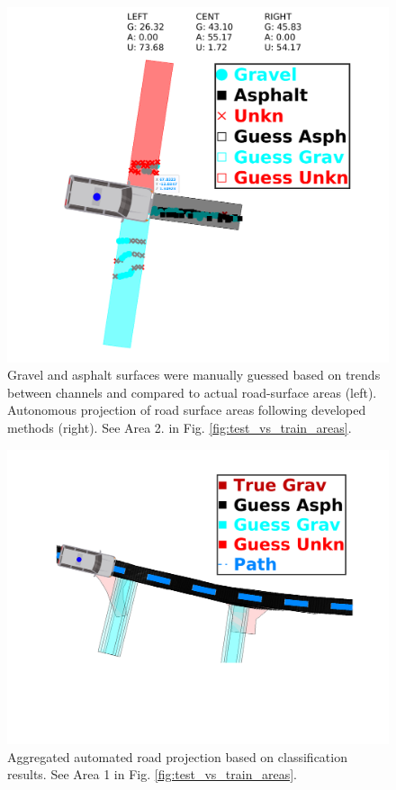 \documentclass[journal,onecolumn]{IEEEtran}
\begin{document}
			\begin{figure}[H]
				\centering
				\includegraphics[width=0.75\linewidth]{figures/auto_area_guess_4}
				\caption[Projected Guess vs Truth]{Gravel and asphalt surfaces were manually guessed based on trends between channels and compared to actual road-surface areas (left). Autonomous projection of road surface areas following developed methods (right). See Area 2. in Fig. \ref{fig:test_vs_train_areas}.}
				\label{fig:auto_area_guess}
			\end{figure}
			
			\begin{figure}[H]
				\centering
				\includegraphics[width=0.75\linewidth]{figures/auto_guess_v_truth_2}
				\caption[Projected Guess over Time vs Truth]{Aggregated automated road projection based on classification results. See Area 1 in Fig. \ref{fig:test_vs_train_areas}.}
				\label{fig:auto_guess_v_truth}
			\end{figure}
			
\end{document}
